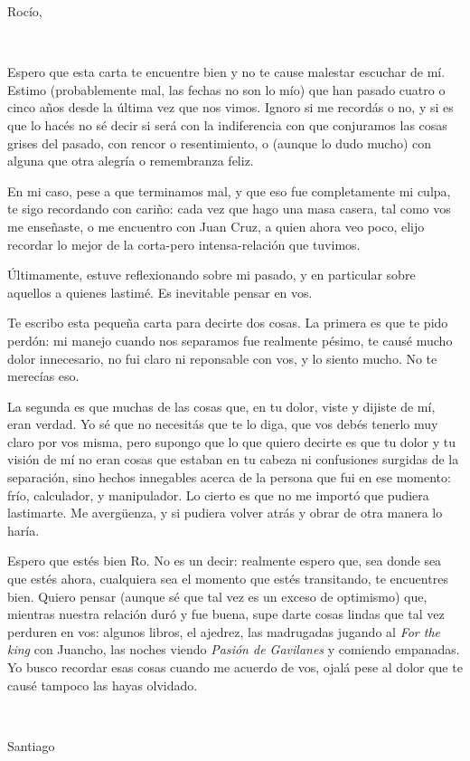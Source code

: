 \documentclass[a4paper, 12pt]{article}
\begin{document}
Rocío,

~

Espero que esta carta te encuentre bien y no te cause malestar escuchar de mí.
Estimo (probablemente mal, las fechas no son lo mío) que han pasado cuatro o
cinco años desde la última vez que nos vimos. Ignoro si me recordás o no, y si
es que lo hacés no sé decir si será con la indiferencia con que conjuramos las
cosas grises del pasado, con rencor o resentimiento, o (aunque lo dudo mucho)
con alguna que otra alegría o remembranza feliz. 

En mi caso, pese a que terminamos mal, y que eso fue completamente mi culpa, te
sigo recordando con cariño: cada vez que hago una masa casera, tal como vos me
enseñaste, o me encuentro con Juan Cruz, a quien ahora veo poco, elijo recordar
lo mejor de la corta-pero intensa-relación que tuvimos.

Últimamente, estuve reflexionando sobre mi pasado, y en particular sobre
aquellos a quienes lastimé. Es inevitable pensar en vos. 

Te escribo esta pequeña carta para decirte dos cosas. La primera es que te pido
perdón: mi manejo cuando nos separamos fue realmente pésimo, te causé mucho
dolor innecesario, no fui claro ni reponsable con vos, y lo siento mucho. No te
merecías eso. 

La segunda es que muchas de las cosas que, en tu dolor, viste y
dijiste de mí, eran verdad. Yo sé que no necesitás que te lo diga, que vos
debés tenerlo muy claro por vos misma, pero supongo que lo que quiero decirte
es que tu dolor y tu visión de mí no eran cosas que estaban en tu cabeza ni
confusiones surgidas de la separación, sino hechos innegables acerca de la
persona que fui en ese momento: frío, calculador, y manipulador. Lo cierto es
que no me importó que pudiera lastimarte. Me avergüenza, y si pudiera volver
atrás y obrar de otra manera lo haría.

Espero que estés bien Ro. No es un decir: realmente espero que, sea donde 
sea que estés ahora, cualquiera sea el momento que estés transitando, te 
encuentres bien. Quiero pensar (aunque sé que tal vez es un exceso de optimismo)
que, mientras nuestra relación duró y fue buena, supe darte cosas lindas que 
tal vez perduren en vos: algunos libros, el ajedrez, las madrugadas jugando 
al \textit{For the king} con Juancho, las noches viendo \textit{Pasión de Gavilanes} y 
comiendo empanadas. Yo busco recordar esas cosas cuando me acuerdo de vos, 
ojalá pese al dolor que te causé tampoco las hayas olvidado.

~

Santiago
\end{document}
